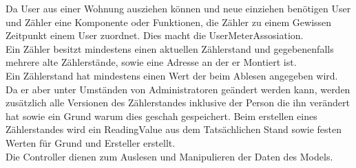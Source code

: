 Da User aus einer Wohnung ausziehen können und neue einziehen benötigen User und Zähler eine Komponente oder Funktionen, die Zähler zu einem Gewissen Zeitpunkt einem User zuordnet. Dies macht die UserMeterAssosiation.\\
Ein Zähler besitzt mindestens einen aktuellen Zählerstand und gegebenenfalls mehrere alte Zählerstände, sowie eine Adresse an der er Montiert ist.\\
Ein Zählerstand hat mindestens einen Wert der beim Ablesen angegeben wird. Da er aber unter Umständen von Administratoren geändert werden kann, werden zusätzlich alle Versionen des Zählerstandes inklusive der Person die ihn verändert hat sowie ein Grund warum dies geschah gespeichert. Beim erstellen eines Zählerstandes wird ein ReadingValue aus dem Tatsächlichen Stand sowie festen Werten für Grund und Ersteller erstellt.\\
Die Controller dienen zum Auslesen und Manipulieren der Daten des Models.